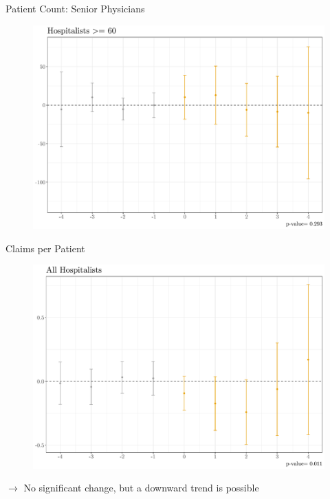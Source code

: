 \documentclass[10pt]{beamer}
\begin{document}
\begin{frame}{Patient Count: Senior Physicians}
\begin{figure}[ht]
    \centering
    \includegraphics[scale=.4]{Objects/Presentation_patients_old.pdf}
\end{figure}
\end{frame}

\begin{frame}{Claims per Patient}
\begin{figure}[ht]
    \centering
    \includegraphics[scale=.35]{Objects/Presentation_claimperpatient_all.pdf}
\end{figure}
$\rightarrow$ No significant change, but a downward trend is possible
\end{frame}
\end{document}
